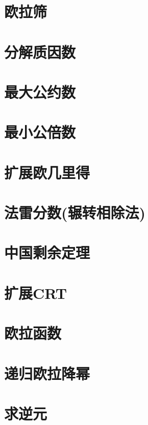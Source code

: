 \section{欧拉筛}
\raggedbottom
\hrulefill
\section{分解质因数}
\raggedbottom
\hrulefill
\section{最大公约数}
\raggedbottom
\hrulefill
\section{最小公倍数}
\raggedbottom
\hrulefill
\section{扩展欧几里得}
\raggedbottom
\hrulefill
\section{法雷分数(辗转相除法)}
\raggedbottom
\hrulefill
\section{中国剩余定理}
\raggedbottom
\hrulefill
\section{扩展CRT}
\raggedbottom
\hrulefill
\section{欧拉函数}
\raggedbottom
\hrulefill
\section{递归欧拉降幂}
\raggedbottom
\hrulefill
\section{求逆元}
\raggedbottom
\hrulefill
